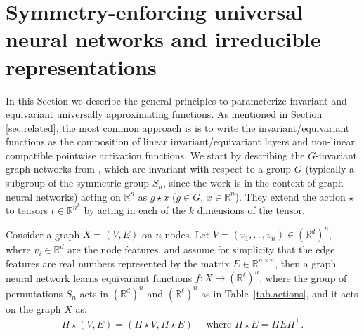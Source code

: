 \documentclass{article}
\theoremstyle{Hogg}
\renewcommand{\ldots}{.\,.\,}
\begin{document}



\clearpage
\appendix 

\section{Symmetry-enforcing universal neural networks and irreducible representations} \label{sec:app.irred}

In this Section we describe the general principles to parameterize invariant and equivariant universally approximating functions. As mentioned in Section \ref{sec.related}, the most common approach is is to write the invariant/equivariant functions as the composition of linear invariant/equivariant layers and non-linear compatible pointwise activation functions. 
We start by describing the $G$-invariant graph networks from \cite{maron2019universality}, which
are invariant with respect to a group $G$ 
(typically a subgroup of the symmetric group $S_n$, since the work is in the context of graph neural networks) 
acting on $\mathbb R^n$ as $g\star   x$ ($g\in G$, $  x\in \mathbb R^n$). They extend the action $\star$ to tensors $  t \in \mathbb R^{n^k}$ 
 by acting in each of the $k$ dimensions of the tensor.
 
Consider a graph $ X=( V,  E)$ on $n$ nodes.
Let $ V=(v_1, \ldots, v_n)\in (\mathbb R^d)^n$, where $v_i\in \mathbb R^d$ are the node features, and assume for simplicity that the edge features are real numbers represented by the matrix $E\in \mathbb R^{n\times n}$, then a graph neural network learns  equivariant functions $f:X\to (\mathbb R^{\ell})^n$, where the group of permutations $S_n$ acts in $(\mathbb R^{d})^n$ and $(\mathbb R^{\ell})^n$ as in Table~\ref{tab.actions}, and it acts on the graph $X$ as:
\begin{align} \label{pi.action}
\Pi\star ( V,  E) = (\Pi \star  V, \Pi \star  E) \quad \text{ where } \Pi \star  E = \Pi  E\Pi^\top.
\end{align}
\end{document}
